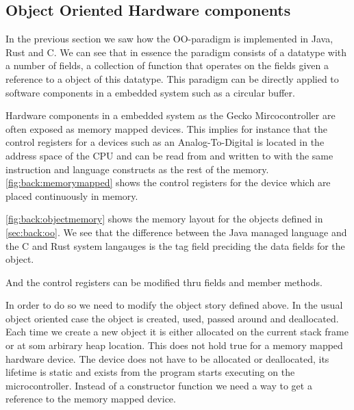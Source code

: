 \subsection{Object Oriented Hardware components}

In the previous section we saw how the OO-paradigm is implemented in Java, Rust and C.
We can see that in essence the paradigm consists of a datatype with a number of fields, a collection of function that operates on the fields given a reference to a object of this datatype.
This paradigm can be directly applied to software components in a embedded system such as a circular buffer.

Hardware components in a embedded system as the Gecko Mircocontroller are often exposed as memory mapped devices.
This implies for instance that the control registers for a devices such as an Analog-To-Digital is located in the address space of the CPU and can be read from and written to with the same instruction and language constructs as the rest of the memory.
\autoref{fig:back:memorymapped} shows the control registers for the device which are placed continuously in memory.

\autoref{fig:back:objectmemory} shows the memory layout for the objects defined in \autoref{sec:back:oo}.
We see that the difference between the Java managed language and the C and Rust system langauges is the tag field preciding the data fields for the object.


And the control registers can be modified thru fields and member methods.

In order to do so we need to modify the object story defined above.
In the usual object oriented case the object is created, used, passed around and deallocated.
Each time we create a new object it is either allocated on the current stack frame or at som arbirary heap location.
This does not hold true for a memory mapped hardware device.
The device does not have to be allocated or deallocated, its lifetime is static and exists from the program starts executing on the microcontroller.
Instead of a constructor function we need a way to get a reference to the memory mapped device.

